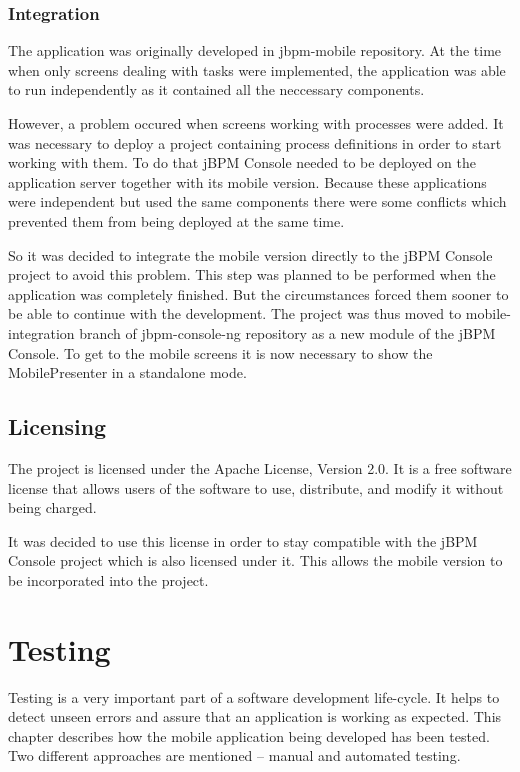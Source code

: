 \documentclass[12pt,oneside,final]{fithesis2}
\begin{document}
\subsection{Integration}
\label{subsec:integration}
The application was originally developed in jbpm-mobile\footnotemark{} repository.
At the time when only screens dealing with tasks were implemented, the application was able to run independently as it contained all the neccessary components.

However, a problem occured when screens working with processes were added.
It was necessary to deploy a project containing process definitions in order to start working with them.
To do that jBPM Console needed to be deployed on the application server together with its mobile version.
Because these applications were independent but used the same components there were some conflicts which prevented them from being deployed at the same time.

So it was decided to integrate the mobile version directly to the jBPM Console project to avoid this problem.
This step was planned to be performed when the application was completely finished.
But the circumstances forced them sooner to be able to continue with the development.
The project was thus moved to mobile-integration branch of jbpm-console-ng repository\footnotemark{} as a new module of the jBPM Console.
To get to the mobile screens it is now necessary to show the MobilePresenter in a standalone mode.

\section{Licensing}
The project is licensed under the Apache License, Version 2.0\footnotemark{}.
It is a free software license that allows users of the software to use, distribute, and modify it without being charged.

It was decided to use this license in order to stay compatible with the jBPM Console project which is also licensed under it.
This allows the mobile version to be incorporated into the project.

\chapter{Testing}
Testing is a very important part of a software development life-cycle.
It helps to detect unseen errors and assure that an application is working as expected.
This chapter describes how the mobile application being developed has been tested.
Two different approaches are mentioned -- manual and automated testing.
\end{document}
